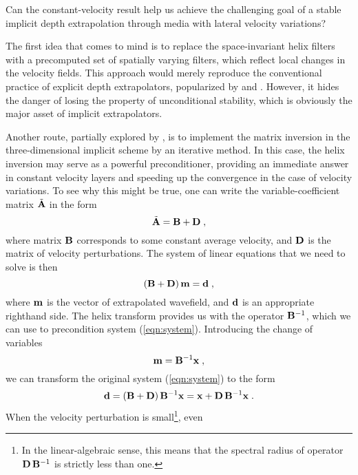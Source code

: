 Can the constant-velocity result help us achieve the challenging goal
of a stable implicit depth extrapolation through media with lateral
velocity variations?
\par
The first idea that comes to mind is to replace the space-invariant
helix filters with a precomputed set of spatially varying filters,
which reflect local changes in the velocity fields. This approach
would merely reproduce the conventional practice of explicit depth
extrapolators, popularized by  and
. However, it hides the danger of losing
the property of unconditional stability, which is obviously the major
asset of implicit extrapolators.
\par
Another route, partially explored by , is
to implement the matrix inversion in the three-dimensional implicit
scheme by an iterative method. In this case, the helix inversion may
serve as a powerful preconditioner, providing an immediate answer in
constant velocity layers and speeding up the convergence in the case
of velocity variations. To see why this might be true, one can write
the variable-coefficient matrix $\tilde{\bold{A}}$ in the form
\begin{equation}
  \label{eqn:golub}
  \tilde{\bold{A}} = \bold{B} + \bold{D}\;,
\end{equation}
where matrix $\bold{B}$ corresponds to some constant average velocity,
and $\bold{D}$ is the matrix of velocity perturbations. The system of
linear equations that we need to solve is then
\begin{equation}
  \label{eqn:system}
  \left(\bold{B} + \bold{D}\right) \bold{m} = \bold{d}\;,
\end{equation}
where $\bold{m}$ is the vector of extrapolated wavefield, and
$\bold{d}$ is an appropriate righthand side. The helix transform
provides us with the operator $\bold{B}^{-1}$, which we can use to
precondition system (\ref{eqn:system}). Introducing the change of
variables
\begin{equation}
  \label{eqn:prec}
  \bold{m} = \bold{B}^{-1} \bold{x}\;,
\end{equation}
we can transform the original system (\ref{eqn:system}) to the form
\begin{equation}
  \label{eqn:system2}
  \bold{d} = \left(\bold{B} + \bold{D}\right) \bold{B}^{-1} \bold{x} = 
  \bold{x} + \bold{D}\,\bold{B}^{-1} \bold{x}\;.
\end{equation}
When the velocity perturbation is small\footnote{In the
  linear-algebraic sense, this means that the spectral radius of
  operator $\bold{D}\,\bold{B}^{-1}$ is strictly less than one.}, even
